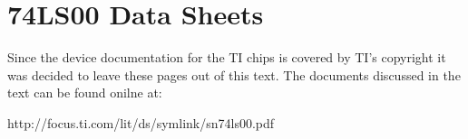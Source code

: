 \chapter{74LS00 Data Sheets}

\label{page:74ls00}
Since the device documentation for the TI chips is
covered by TI's copyright it was decided to leave
these pages out of this text.  The documents discussed
in the text can be found onilne at:

http://focus.ti.com/lit/ds/symlink/sn74ls00.pdf
